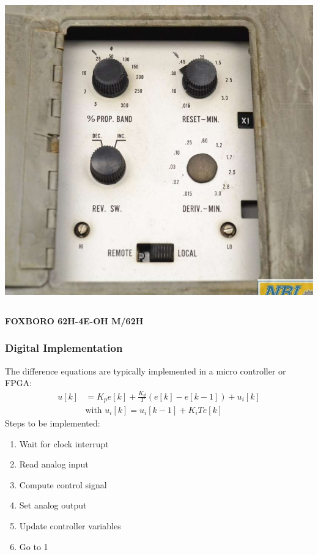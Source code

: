 \begin{frame}
\begin{columns}
\begin{column}{0.5\linewidth}
			\includegraphics[height=0.6\textheight]{img/fb4}
		\end{column}
	\end{columns}
	\begin{center}
		\textbf{FOXBORO 62H-4E-OH M/62H}
	\end{center}
\end{frame}

\begin{frame}[fragile]
	\frametitle{Digital Implementation}
	The difference equations are typically implemented in a micro controller or FPGA:
		\begin{align*}
		u[k] &= K_p e[k] + \frac{K_d}{T}(e[k] - e[k-1])+u_i[k] \\
		&\text{with } u_i[k] = u_i[k-1] + K_i T e[k]
		\end{align*}
	Steps to be implemented:
	\begin{enumerate}
		\item Wait for clock interrupt
		\item Read analog input
		\item Compute control signal
		\item Set analog output
		\item Update controller variables
		\item Go to 1
	\end{enumerate}
\end{frame}

